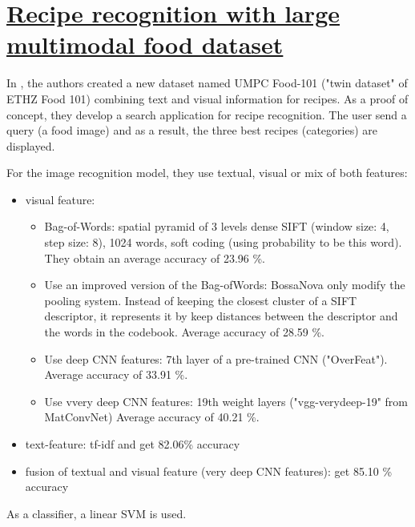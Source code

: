 \section{\href{http://ieeexplore.ieee.org/lpdocs/epic03/wrapper.htm?arnumber=7169757}{Recipe recognition with large multimodal food dataset}}

In \cite{Wang2015}, the authors created a new dataset named UMPC Food-101 ("twin dataset" of ETHZ Food 101) combining text and visual information for recipes. As a proof of concept, they develop a search application for recipe recognition. The user send a query (a food image) and as a result, the three best recipes (categories) are displayed.

For the image recognition model, they use textual, visual or mix of both features:
\begin{itemize}
    \item visual feature:
        \begin{itemize}
            \item Bag-of-Words:
            spatial pyramid of 3 levels
            dense SIFT (window size: 4, step size: 8), 1024 words, soft coding (using probability to be this word).
            They obtain an  average accuracy of 23.96 \%.
            
            \item Use an improved version of the Bag-ofWords: BossaNova only modify the pooling system. Instead of keeping the closest cluster of a SIFT descriptor, it represents it by keep distances between the descriptor and the words in the codebook.
            Average accuracy of 28.59 \%.
            
            \item Use deep CNN features: 7th layer of a pre-trained CNN ("OverFeat"). 
            Average accuracy of 33.91 \%.
            
            \item Use vvery deep CNN features: 19th weight layers ("vgg-verydeep-19" from MatConvNet)
            Average accuracy of 40.21 \%.
        \end{itemize}
    \item text-feature: tf-idf and get 82.06\% accuracy
    
    \item fusion of textual and visual feature (very deep CNN features): get 85.10 \% accuracy
\end{itemize}

As a classifier, a linear SVM is used.

